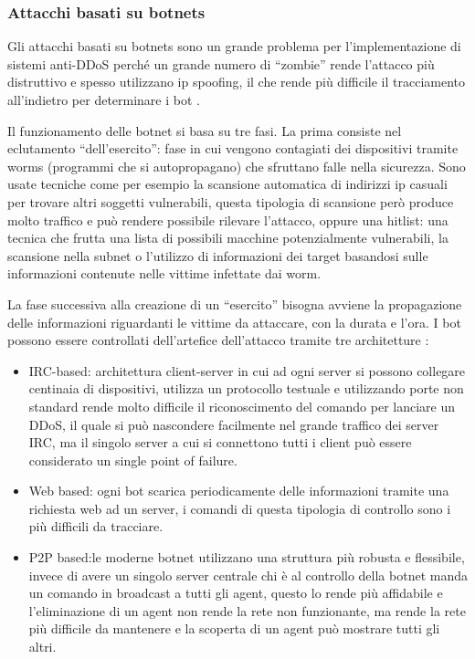 \subsubsection{Attacchi basati su botnets}

Gli attacchi basati su botnets sono un grande problema per l'implementazione di sistemi anti-DDoS perché un grande numero di ``zombie'' rende l'attacco più distruttivo e spesso utilizzano ip spoofing, il che rende più difficile il tracciamento all'indietro per determinare i bot \cite{ddos_survey_1}.

Il funzionamento delle botnet si basa su tre fasi. La prima consiste nel eclutamento ``dell'esercito'': fase in cui vengono contagiati dei dispositivi tramite worms (programmi che si autopropagano) che sfruttano falle nella sicurezza. Sono usate tecniche come per esempio la scansione automatica di indirizzi ip casuali per trovare altri soggetti vulnerabili, questa tipologia di scansione però produce molto traffico e può rendere possibile rilevare l'attacco, oppure una hitlist: una tecnica che frutta una lista di possibili macchine potenzialmente vulnerabili, la scansione nella subnet o l'utilizzo di informazioni dei target basandosi sulle informazioni contenute nelle vittime infettate dai worm.


La fase successiva alla creazione di un ``esercito'' bisogna avviene la propagazione delle informazioni riguardanti le vittime da attaccare, con la durata e l'ora.
I bot possono essere controllati dell'artefice dell'attacco tramite tre architetture \cite{ddos_survey_4}: %
\begin{itemize}
    \item IRC-based: architettura client-server in cui ad ogni server si possono collegare centinaia di dispositivi, utilizza un protocollo testuale e utilizzando porte non standard rende molto difficile il riconoscimento del comando per lanciare un DDoS, il quale si può nascondere facilmente nel grande traffico dei server IRC, ma il singolo server a cui si connettono tutti i client può essere considerato un single point of failure.
    \item Web based: ogni bot scarica periodicamente delle informazioni tramite una richiesta web ad un server, i comandi di questa tipologia di controllo sono i più difficili da tracciare.
    \item P2P based:le moderne botnet utilizzano una struttura più robusta e flessibile, invece di avere un singolo server centrale chi è al controllo della botnet manda un comando in broadcast a tutti gli agent, questo lo rende più affidabile e l'eliminazione di un agent non rende la rete non funzionante, ma rende la rete più difficile da mantenere e la scoperta di un agent può mostrare tutti gli altri. 
\end{itemize}

